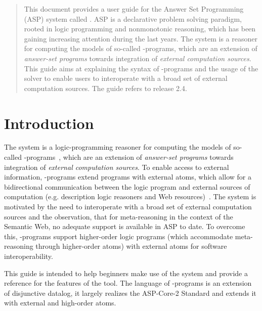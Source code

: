 \documentclass[a4paper, titlepage]{article}
\begin{document}
\begin{abstract}
This document provides a user guide for the Answer Set 
Programming (ASP) system called \dlvhex{}.
ASP is a declarative 
problem solving paradigm, rooted in logic programming and 
nonmonotonic reasoning, which has been gaining increasing 
attention during the last years. The \dlvhex{} system is a 
reasoner for computing the models of so-called \hex{}-programs, which are an extension of \emph{answer-set 
programs} towards integration of \emph{external computation 
sources}. This guide aims at explaining the syntax
of \hex{}-programs and the usage of the \dlvhex{} solver
to enable users 
to interoperate with a broad set of external computation 
sources. The guide refers to release 2.4.     
\end{abstract}


\setcounter{tocdepth}{2}
\tableofcontents


\newpage
\section{Introduction} %
\label{sec:intro}
The \dlvhex{} system is a logic-programming reasoner for 
computing the models of so-called \hex{}-programs~\cite{efikrs2015}, which 
are an extension of \emph{answer-set programs} towards 
integration of \emph{external computation sources}. To 
enable access to external information, \hex{}-programs 
extend programs with external atoms, which allow for a 
bidirectional communication between the logic program and 
external sources of computation (e.g. description logic 
reasoners and Web resources)~\cite{efkr2012}.
The system is motivated by the need to interoperate with a 
broad set of external computation sources and the 
observation, that for meta-reasoning in the context of the 
Semantic Web, no adequate support is available in ASP to 
date.
To overcome this, \hex{}-programs support higher-order logic programs 
(which accommodate meta-reasoning through higher-order 
atoms) with external atoms for software interoperability.

This guide is intended to help beginners make use of the system and 
provide a reference for the features of the tool.
The language of \hex{}-programs is an extension of disjunctive datalog,
it largely realizes the ASP-Core-2 Standard \cite{cffiklrs2013}
and extends it with external and high-order atoms. 
\end{document}
